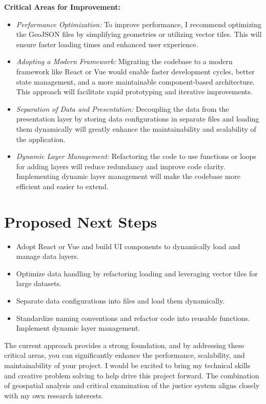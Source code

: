 \documentclass[letterpaper,10pt,colorlinks,linkcolor=cyan]{moderncv}
\begin{document}
\textbf{Critical Areas for Improvement:}
\begin{itemize}
	\item \textit{Performance Optimization:} To improve performance, I recommend optimizing the GeoJSON files by simplifying geometries or utilizing vector tiles. This will ensure faster loading times and enhanced user experience.
	\item \textit{Adopting a Modern Framework:} Migrating the codebase to a modern framework like React or Vue would enable faster development cycles, better state management, and a more maintainable component-based architecture. This approach will facilitate rapid prototyping and iterative improvements.
	\item \textit{Separation of Data and Presentation:} Decoupling the data from the presentation layer by storing data configurations in separate files and loading them dynamically will greatly enhance the maintainability and scalability of the application.
	\item \textit{Dynamic Layer Management:} Refactoring the code to use functions or loops for adding layers will reduce redundancy and improve code clarity. Implementing dynamic layer management will make the codebase more efficient and easier to extend.
\end{itemize}

\section*{Proposed Next Steps}
\begin{itemize}
	\item Adopt React or Vue and build UI components to dynamically load and manage data layers.
	\item Optimize data handling by refactoring loading and leveraging vector tiles for large datasets.
	\item Separate data configurations into files and load them dynamically.
	\item Standardize naming conventions and refactor code into reusable functions. Implement dynamic layer management.
\end{itemize}

The current approach provides a strong foundation, and by addressing these critical areas, you can significantly enhance the performance, scalability, and maintainability of your project. I would be excited to bring my technical skills and creative problem solving to help drive this project forward. The combination of geospatial analysis and critical examination of the justice system aligns closely with my own research interests.
\end{document}
